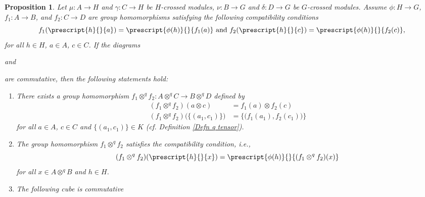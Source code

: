 \documentclass[12pt]{elsarticle}
\newtheorem*{main corollary*}{Main Corollary}
\newtheorem{prop}[theorem]{Proposition}
\theoremstyle{definition}
\newcommand{\tens}{
	\otimes^q}
\begin{document}
\begin{prop}\label{The commutative cube}
    Let $\mu:A \to H$ and $\gamma:C \to H$ be $H$-crossed modules, $\nu:B \to G$ and $\delta:D \to G$ be $G$-crossed modules. Assume $\phi: H \to G$, $f_1: A \to B$, and $f_2: C \to D$ are group homomorphisms satisfying the following compatibility conditions
    \begin{equation}\label{compatability conditions}
        f_1(\prescript{h}{}{a})=\prescript{\phi(h)}{}{f_1(a)} \text{ and } 
        f_2(\prescript{h}{}{c})=\prescript{\phi(h)}{}{f_2(c)},
    \end{equation}
    for all $h\in H$, $a\in A$, $c\in C$. If the diagrams
    \begin{center}
   \qquad and \qquad{}
    \end{center}
   are commutative, then the following statements hold: 
 \begin{enumerate}
     \item [(i)] There exists a group homomorphism $f_1 \tens f_2: A \tens C \to B \tens D$ defined by 
     \begin{align*}
         (f_1 \tens f_2)(a \otimes c)&=f_1(a) \otimes f_2(c) \\
         (f_1 \tens f_2) \big(\big\{(a_1,c_1) \big\}\big)&=\big\{\big(f_1(a_1),f_2(c_1)\big)\big\}
     \end{align*}
     for all $a\in A$, $c \in C$ and $\{(a_1,c_1)\} \in K$ (\textit{cf.} Definition \ref{Defn q tensor}).
     \item[(ii)] The group homomorphism $f_1 \tens f_2$ satisfies the compatibility condition, i.e.,
     \[(f_1 \tens f_2)(\prescript{h}{}{x}) =\prescript{\phi(h)}{}{(f_1 \tens f_2)(x)}\]
     for all $x \in A \tens B$ and $h \in H$.
     \item[(iii)] The following cube is commutative
\begin{center}
\end{center}
\end{enumerate}
\end{prop}
\end{document}
